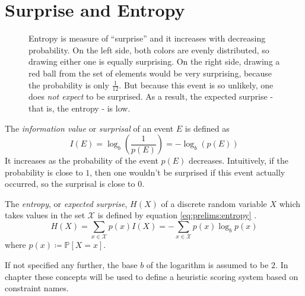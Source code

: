 		\clearpage
	
	\section{Surprise and Entropy}
	
		\begin{figure}[ht!]
			\centering
			
			\caption{Entropy is measure of \enquote{surprise} and it increases with decreasing probability. On the left side, both colors are evenly distributed, so drawing either one is equally surprising. On the right side, drawing a red ball from the set of elements would be very surprising, because the probability is only $\frac{1}{12}$. But because this event is so unlikely, one does \textit{not expect} to be surprised. As a result, the expected surprise - that is, the entropy - is low.}
			\label{figure:prelim:entropy}
		\end{figure}
	
		The \textit{information value} or \textit{surprisal} of an event $E$ is defined as
		\begin{equation}
			I(E) = \log_b \left( \frac{1}{p(E)} \right) = - \log_b \left( p(E) \right)
		\end{equation}
		It increases as the probability of the event $p(E)$ decreases.
		Intuitively, if the probability is close to $1$, then one wouldn't be surprised if this event actually occurred, so the surprisal is close to $0$.
		
		The \textit{entropy}, or \textit{expected surprise}, $H(X)$ of a discrete random variable $X$ which takes values in the set $\mathcal{X}$ is defined by equation \ref{eq:prelims:entropy} \cite{coverElementsInformationTheory2006}.
		\begin{equation}
		\label{eq:prelims:entropy}
			H(X) =  \sum_{x \in \mathcal{X}} p(x) I(X) = - \sum_{x \in \mathcal{X}} p(x) \log_b p(x)
		\end{equation}
		where $p(x) \coloneq \mathbb{P}[X = x]$.
		
		If not specified any further, the base $b$ of the logarithm is assumed to be $2$.
		In chapter  these concepts will be used to define a heuristic scoring system based on constraint names.
